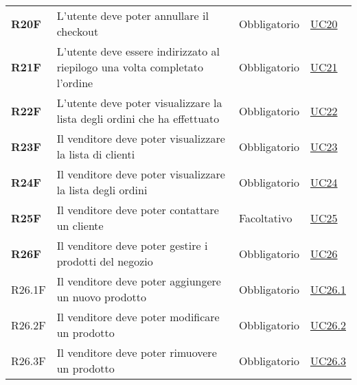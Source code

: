 \begin{center}
\begin{longtable}[!h]{p{50px} p{245px} p{75px} p{50px}}
        \textbf{R20F}                         & L'utente deve poter annullare il checkout                                                                  & Obbligatorio             & \hyperref[sec:UC20]{UC20}                    \\
        \textbf{R21F}                         & L'utente deve essere indirizzato al riepilogo una volta completato l'ordine                                & Obbligatorio             & \hyperref[sec:UC21]{UC21}                    \\
        \textbf{R22F}                         & L'utente deve poter visualizzare la lista degli ordini che ha effettuato                                   & Obbligatorio             & \hyperref[sec:UC22]{UC22}                    \\
        \textbf{R23F}                         & Il venditore deve poter visualizzare la lista di clienti                                                   & Obbligatorio             & \hyperref[sec:UC23]{UC23}                    \\
        \textbf{R24F}                         & Il venditore deve poter visualizzare la lista degli ordini                                                 & Obbligatorio             & \hyperref[sec:UC24]{UC24}                    \\
        \textbf{R25F}                         & Il venditore deve poter contattare un cliente                                                              & Facoltativo              & \hyperref[sec:UC25]{UC25}                    \\
        \textbf{R26F}                         & Il venditore deve poter gestire i prodotti del negozio                                                     & Obbligatorio             & \hyperref[sec:UC26]{UC26}                    \\
        R26.1F                                & Il venditore deve poter aggiungere un nuovo prodotto                                                       & Obbligatorio             & \hyperref[sec:UC26.1]{UC26.1}                \\
        R26.2F                                & Il venditore deve poter modificare un prodotto                                                             & Obbligatorio             & \hyperref[sec:UC26.2]{UC26.2}                \\
        R26.3F                                & Il venditore deve poter rimuovere un prodotto                                                              & Obbligatorio             & \hyperref[sec:UC26.3]{UC26.3}                \\

\end{longtable}
\end{center}
